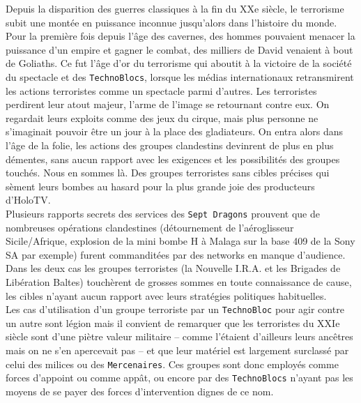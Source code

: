 \documentclass[11pt,twoside,a4paper]{article}
\begin{document}
\begin{multicols*}{2}
Depuis la disparition des guerres classiques {\`a} la fin du XXe si{\`e}cle, le terrorisme subit une mont{\'e}e en puissance inconnue jusqu'alors dans l'histoire du monde. Pour la premi{\`e}re fois depuis l'{\^a}ge des cavernes, des hommes pouvaient menacer la puissance d'un empire et gagner le combat, des milliers de David venaient {\`a} bout de Goliaths. Ce fut l'{\^a}ge d'or du terrorisme qui aboutit {\`a} la victoire de la soci{\'e}t{\'e} du spectacle et des \texttt{TechnoBlocs}, lorsque les m{\'e}dias internationaux retransmirent les actions terroristes comme un spectacle parmi d'autres. Les terroristes perdirent leur atout majeur, l'arme de l'image se retournant contre eux. On regardait leurs exploits comme des jeux du cirque, mais plus personne ne s'imaginait pouvoir {\^e}tre un jour {\`a} la place des gladiateurs. On entra alors dans l'{\^a}ge de la folie, les actions des groupes clandestins devinrent de plus en plus d{\'e}mentes, sans aucun rapport avec les exigences et les possibilit{\'e}s des groupes touch{\'e}s. Nous en sommes l{\`a}. Des groupes terroristes sans cibles pr{\'e}cises qui s{\`e}ment leurs bombes au hasard pour la plus grande joie des producteurs d'HoloTV. ~\\

Plusieurs rapports secrets des services des \texttt{Sept Dragons} prouvent que de nombreuses op{\'e}rations clandestines (d{\'e}tournement de l'a{\'e}roglisseur Sicile/Afrique, explosion de la mini bombe H {\`a} Malaga sur la base 409 de la Sony SA par exemple) furent commandit{\'e}es par des networks en manque d'audience. Dans les deux cas les groupes terroristes (la Nouvelle I.R.A. et les Brigades de Lib{\'e}ration Baltes) touch{\`e}rent de grosses sommes en toute connaissance de cause, les cibles n'ayant aucun rapport avec leurs strat{\'e}gies politiques habituelles.~\\

Les cas d'utilisation d'un groupe terroriste par un \texttt{TechnoBloc} pour agir contre un autre sont l{\'e}gion mais il convient de remarquer que les terroristes du XXIe si{\`e}cle sont d'une pi{\`e}tre valeur militaire -- comme l'{\'e}taient d'ailleurs leurs anc{\^e}tres mais on ne s'en apercevait pas -- et que leur mat{\'e}riel est largement surclass{\'e} par celui des milices ou des \texttt{Mercenaires}. Ces groupes sont donc employ{\'e}s comme forces d'appoint ou comme app{\^a}t, ou encore par des \texttt{TechnoBlocs} n'ayant pas les moyens de se payer des forces d'intervention dignes de ce nom. ~\\


\end{multicols*}
\end{document}

